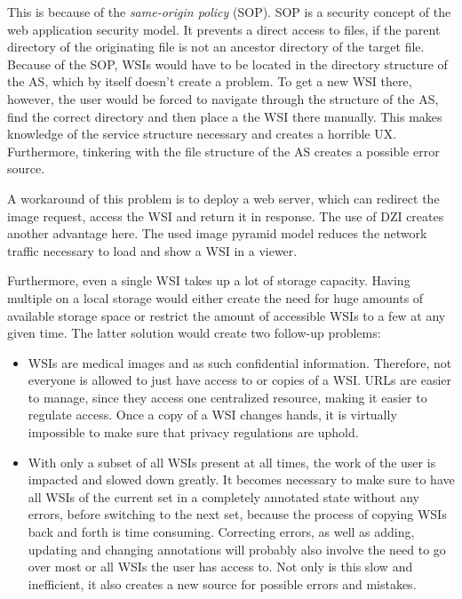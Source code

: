 This is because of the \emph{same-origin policy} (SOP). SOP is a security concept of the web application security model. It prevents a direct access to files, if the parent directory of the originating file is not an ancestor directory of the target file\cite{web:mdn}. Because of the SOP, WSIs would have to be located in the directory structure of the AS, which by itself doesn't create a problem. To get a new WSI there, however, the user would be forced to navigate through the structure of the AS, find the correct directory and then place a the WSI there manually. This makes knowledge of the service structure necessary and creates a horrible UX. Furthermore, tinkering with the file structure of the AS creates a possible error source.

A workaround of this problem is to deploy a web server, which can redirect the image request, access the WSI and return it in response\cite{Tseytlin14}. The use of DZI creates another advantage here. The used image pyramid model reduces the network traffic necessary to load and show a WSI in a viewer\cite{Cornish13}\cite{DICOM10}.

Furthermore, even a single WSI takes up a lot of storage capacity\cite{Singh11}. Having multiple on a local storage would either create the need for huge amounts of available storage space or restrict the amount of accessible WSIs to a few at any given time. The latter solution would create two follow-up problems:
\begin{itemize}
	\item WSIs are medical images and as such confidential information. Therefore, not everyone is allowed to just have access to or copies of a WSI\cite{COA}\cite{USSanDiego}. URLs are easier to manage, since they access one centralized resource, making it easier to regulate access. Once a copy of a WSI changes hands, it is virtually impossible to make sure that privacy regulations are uphold.
	\item With only a subset of all WSIs present at all times, the work of the user is impacted and slowed down greatly. It becomes necessary to make sure to have all WSIs of the current set in a completely annotated state without any errors, before switching to the next set, because the process of copying WSIs back and forth is time consuming. Correcting errors, as well as adding, updating and changing annotations will probably also involve the need to go over most or all WSIs the user has access to. Not only is this slow and inefficient, it also creates a new source for possible errors and mistakes.
\end{itemize}

